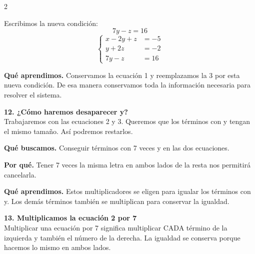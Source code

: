 \documentclass[11pt,a4paper,landscape]{article}
\begin{document}
\begin{multicols*}{2}
\begin{minipage}{\linewidth}
\par\smallskip Escribimos la nueva condición:
\[7y - z = 16\]
\[\left\{\begin{aligned}x - 2y + z &= -5\\y + 2z &= -2\\7y - z &= 16\end{aligned}\right.\]
\par\smallskip\textbf{Qué aprendimos.} Conservamos la ecuación 1 y reemplazamos la 3 por esta nueva condición. De esa manera conservamos toda la información necesaria para resolver el sistema.
\end{minipage}\par\medskip
\noindent\begin{minipage}{\linewidth}\textbf{12. ¿Cómo haremos desaparecer y?}\\[2pt]Trabajaremos con las ecuaciones 2 y 3. Queremos que los términos con y tengan el mismo tamaño. Así podremos restarlos.
\par\smallskip\textbf{Qué buscamos.} Conseguir términos con 7 veces y en las dos ecuaciones.
\par\smallskip\textbf{Por qué.} Tener 7 veces la misma letra en ambos lados de la resta nos permitirá cancelarla.
\par{}\par\smallskip
\par\smallskip\textbf{Qué aprendimos.} Estos multiplicadores se eligen para igualar los términos con y. Los demás términos también se multiplican para conservar la igualdad.
\end{minipage}\par\medskip
\noindent\begin{minipage}{\linewidth}\textbf{13. Multiplicamos la ecuación 2 por 7}\\[2pt]Multiplicar una ecuación por 7 significa multiplicar CADA término de la izquierda y también el número de la derecha. La igualdad se conserva porque hacemos lo mismo en ambos lados.

\end{minipage}
\end{multicols*}
\end{document}
